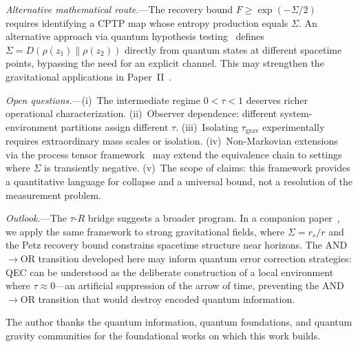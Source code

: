 \documentclass[prl,twocolumn,superscriptaddress,longbibliography,floatfix]{revtex4-2}
\newcommand{\tauasym}{\tau}
\begin{document}
\emph{Alternative mathematical route.}---The recovery bound
$F \geq \exp(-\Sigma/2)$ requires identifying a CPTP map whose
entropy production equals $\Sigma$.  An alternative approach via
quantum hypothesis testing~\cite{HayashiYamasaki2025} defines
$\Sigma = D(\rho(z_1)\|\rho(z_2))$ directly from quantum states at
different spacetime points, bypassing the need for an explicit channel.
This may strengthen the gravitational applications in
Paper~II~\cite{Paper2}.

\emph{Open questions.}---(i)~The intermediate regime
$0 < \tauasym < 1$ deserves richer operational characterization.
(ii)~Observer dependence: different system-environment partitions
assign different $\tauasym$.  (iii)~Isolating
$\tauasym_{\mathrm{grav}}$ experimentally requires extraordinary
mass scales or isolation.  (iv)~Non-Markovian extensions via the
process tensor framework~\cite{Pollock2018} may extend the
equivalence chain to settings where $\Sigma$ is transiently negative.
(v)~The scope of claims: this framework provides a quantitative
language for collapse and a universal bound, not a resolution of the
measurement problem.

\emph{Outlook.}---The $\tauasym$-$R$ bridge suggests a broader
program.  In a companion paper~\cite{Paper2}, we apply the same
framework to strong gravitational fields, where $\Sigma = r_s/r$
and the Petz recovery bound constrains spacetime structure
near horizons.  The AND$\to$OR transition developed here may inform
quantum error correction strategies: QEC can be understood as the
deliberate construction of a local environment where
$\tauasym \approx 0$---an artificial suppression of the arrow of
time, preventing the AND$\to$OR transition that would destroy encoded
quantum information.

\begin{acknowledgments}
The author thanks the quantum information, quantum foundations,
and quantum gravity communities for the foundational works on
which this work builds.
\end{acknowledgments}

\end{document}
